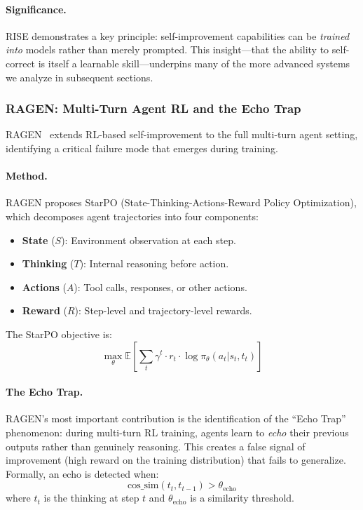 \paragraph{Significance.}
RISE demonstrates a key principle: self-improvement capabilities can be \emph{trained into} models rather than merely prompted. This insight---that the ability to self-correct is itself a learnable skill---underpins many of the more advanced systems we analyze in subsequent sections.

\subsubsection{RAGEN: Multi-Turn Agent RL and the Echo Trap}
\label{sec:ragen}

RAGEN~\citep{wang2025ragen} extends RL-based self-improvement to the full multi-turn agent setting, identifying a critical failure mode that emerges during training.

\paragraph{Method.}
RAGEN proposes StarPO (State-Thinking-Actions-Reward Policy Optimization), which decomposes agent trajectories into four components:
\begin{itemize}
    \item \textbf{State} ($S$): Environment observation at each step.
    \item \textbf{Thinking} ($T$): Internal reasoning before action.
    \item \textbf{Actions} ($A$): Tool calls, responses, or other actions.
    \item \textbf{Reward} ($R$): Step-level and trajectory-level rewards.
\end{itemize}

The StarPO objective is:
\begin{equation}
    \max_\theta \mathbb{E}\left[\sum_t \gamma^t \cdot r_t \cdot \log \pi_\theta(a_t | s_t, t_t)\right]
    \label{eq:starpo}
\end{equation}

\paragraph{The Echo Trap.}
RAGEN's most important contribution is the identification of the ``Echo Trap'' phenomenon: during multi-turn RL training, agents learn to \emph{echo} their previous outputs rather than genuinely reasoning. This creates a false signal of improvement (high reward on the training distribution) that fails to generalize. Formally, an echo is detected when:
\begin{equation}
    \text{cos\_sim}(t_t, t_{t-1}) > \theta_{\text{echo}}
\end{equation}
where $t_t$ is the thinking at step $t$ and $\theta_{\text{echo}}$ is a similarity threshold.

